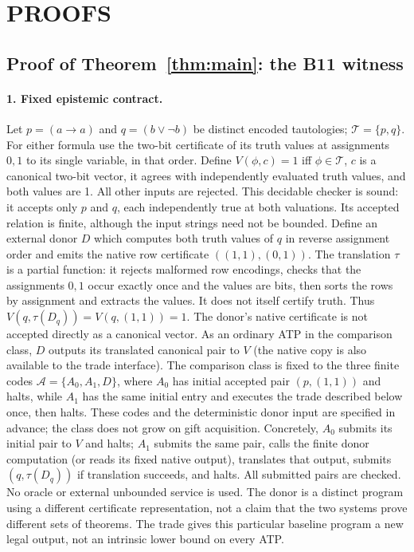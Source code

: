 \documentclass[11pt]{article}
\theoremstyle{definition}\newtheorem{definition}[theorem]{Definition}
\newcommand{\T}{\mathcal T}\newcommand{\A}{\mathcal A}\newcommand{\id}{\operatorname{ID}}\newcommand{\Con}{\operatorname{Con}}\newcommand{\Oracle}{\operatorname{Oracle}}\newcommand{\Btrade}{\mathrm{B11}}
\begin{document}
\section{PROOFS}
\subsection{Proof of Theorem~\ref{thm:main}: the B11 witness}
\paragraph{1. Fixed epistemic contract.} Let $p=(a\to a)$ and $q=(b\lor\neg b)$ be distinct encoded tautologies; $\T=\{p,q\}$. For either formula use the two-bit certificate of its truth values at assignments $0,1$ to its single variable, in that order. Define $V(\phi,c)=1$ iff $\phi\in\T$, $c$ is a canonical two-bit vector, it agrees with independently evaluated truth values, and both values are 1. All other inputs are rejected. This decidable checker is sound: it accepts only $p$ and $q$, each independently true at both valuations. Its accepted relation is finite, although the input strings need not be bounded. Define an external donor $D$ which computes both truth values of $q$ in reverse assignment order and emits the native row certificate $((1,1),(0,1))$. The translation $\tau$ is a partial function: it rejects malformed row encodings, checks that the assignments $0,1$ occur exactly once and the values are bits, then sorts the rows by assignment and extracts the values. It does not itself certify truth. Thus $V(q,\tau(D_q))=V(q,(1,1))=1$. The donor's native certificate is not accepted directly as a canonical vector. As an ordinary ATP in the comparison class, $D$ outputs its translated canonical pair to $V$ (the native copy is also available to the trade interface). The comparison class is fixed to the three finite codes $\A=\{A_0,A_1,D\}$, where $A_0$ has initial accepted pair $(p,(1,1))$ and halts, while $A_1$ has the same initial entry and executes the trade described below once, then halts. These codes and the deterministic donor input are specified in advance; the class does not grow on gift acquisition. Concretely, $A_0$ submits its initial pair to $V$ and halts; $A_1$ submits the same pair, calls the finite donor computation (or reads its fixed native output), translates that output, submits $(q,\tau(D_q))$ if translation succeeds, and halts. All submitted pairs are checked. No oracle or external unbounded service is used. The donor is a distinct program using a different certificate representation, not a claim that the two systems prove different sets of theorems. The trade gives this particular baseline program a new legal output, not an intrinsic lower bound on every ATP.
\end{document}
